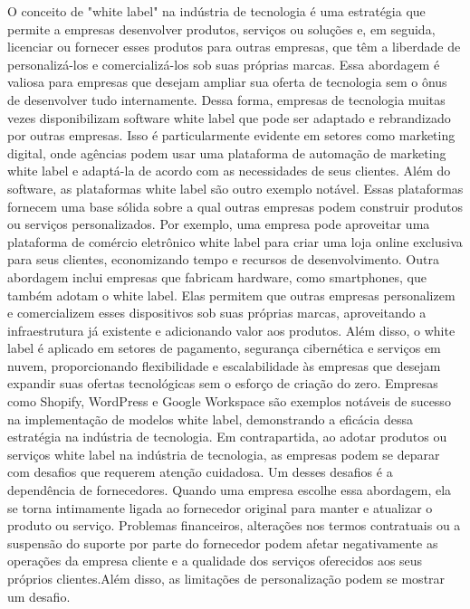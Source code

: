 \documentclass[12pt,twoside,english,brazilian]{article}
\begin{document}
O conceito de "white label" na indústria de tecnologia é uma estratégia que permite a empresas desenvolver produtos, serviços ou soluções e, em seguida, licenciar ou fornecer esses produtos para outras empresas, que têm a liberdade de personalizá-los e comercializá-los sob suas próprias marcas. Essa abordagem é valiosa para empresas que desejam ampliar sua oferta de tecnologia sem o ônus de desenvolver tudo internamente. Dessa forma, empresas de tecnologia muitas vezes disponibilizam software white label que pode ser adaptado e rebrandizado por outras empresas. Isso é particularmente evidente em setores como marketing digital, onde agências podem usar uma plataforma de automação de marketing white label e adaptá-la de acordo com as necessidades de seus clientes. Além do software, as plataformas white label são outro exemplo notável. Essas plataformas fornecem uma base sólida sobre a qual outras empresas podem construir produtos ou serviços personalizados. Por exemplo, uma empresa pode aproveitar uma plataforma de comércio eletrônico white label para criar uma loja online exclusiva para seus clientes, economizando tempo e recursos de desenvolvimento. Outra abordagem inclui empresas que fabricam hardware, como smartphones, que também adotam o white label. Elas permitem que outras empresas personalizem e comercializem esses dispositivos sob suas próprias marcas, aproveitando a infraestrutura já existente e adicionando valor aos produtos. Além disso, o white label é aplicado em setores de pagamento, segurança cibernética e serviços em nuvem, proporcionando flexibilidade e escalabilidade às empresas que desejam expandir suas ofertas tecnológicas sem o esforço de criação do zero. Empresas como Shopify, WordPress e Google Workspace são exemplos notáveis de sucesso na implementação de modelos white label, demonstrando a eficácia dessa estratégia na indústria de tecnologia. Em contrapartida, ao adotar produtos ou serviços white label na indústria de tecnologia, as empresas podem se deparar com desafios que requerem atenção cuidadosa. Um desses desafios é a dependência de fornecedores. Quando uma empresa escolhe essa abordagem, ela se torna intimamente ligada ao fornecedor original para manter e atualizar o produto ou serviço. Problemas financeiros, alterações nos termos contratuais ou a suspensão do suporte por parte do fornecedor podem afetar negativamente as operações da empresa cliente e a qualidade dos serviços oferecidos aos seus próprios clientes.Além disso, as limitações de personalização podem se mostrar um desafio. 
\end{document}
